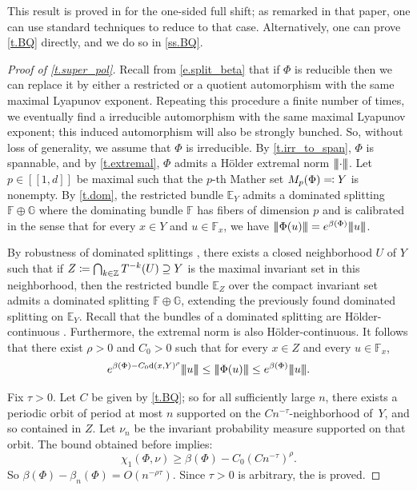 \documentclass[10pt]{amsart}
\newcommand{\ldbrack}{[\![}
\newcommand{\rdbrack}{]\!]}
\def\vcentcolon{\mathrel{\mathop\ordinarycolon}}
\providecommand\ordinarycolon{:}
\providecommand*\coloneqq{\vcentcolon\mathrel{\mkern-1.2mu}=}
\providecommand*\eqqcolon{=\mathrel{\mkern-1.2mu}\vcentcolon}
\let\eqcolon\eqqcolon
\theoremstyle{plain}
\theoremstyle{definition}
\newcommand{\tribar}[1]{\mathopen{| {\kern -1.5pt} | {\kern -1.5pt} |} {#1}
\mathclose{| {\kern -1.5pt} | {\kern -1.5pt} |}}
\newcommand{\ZZ}{\mathbb{Z}}
\newcommand{\EE}{\mathbb{E}}
\newcommand{\FF}{\mathbb{F}}
\newcommand{\GG}{\mathbb{G}}
\newcommand{\dd}{\mathrm{d}}
\begin{document}
This result is proved in \cite{BQuas} for the one-sided full shift; as remarked in that paper, one can use standard techniques to reduce to that case. Alternatively, one can prove \cref{t.BQ} directly, and we do so in \cref{ss.BQ}.

\begin{proof}[Proof of \cref{t.super_pol}]
Recall from \eqref{e.split_beta} that if $\Phi$ is reducible then we can replace it by either a restricted or a quotient automorphism with the same maximal Lyapunov exponent.
Repeating this procedure a finite number of times, we eventually find a irreducible automorphism with the same maximal Lyapunov exponent; this induced automorphism will also be strongly bunched.
So, without loss of generality, we assume that $\Phi$ is irreducible.
By \cref{t.irr_to_span}, $\Phi$ is spannable, and by \cref{t.extremal}, $\Phi$ admits a Hölder extremal norm $\tribar{\mathord{\cdot}}$.
Let $p \in \ldbrack 1, d \rdbrack$ be maximal such that the $p$-th Mather set $M_p(\Phi) \eqcolon Y$ is nonempty.
By \cref{t.dom}, the restricted bundle $\EE_Y$ admits a dominated splitting $\FF \oplus \GG$ where the dominating bundle $\FF$ has fibers of dimension $p$ and is calibrated in the sense that for every $x \in Y$ and $u \in \FF_x$, we have
$\tribar{\Phi(u)} = e^{\beta(\Phi)} \tribar{u}$.
	
By robustness of dominated splittings \cite[Cor.\,2.8]{CroPo}, there exists a closed neighborhood $U$ of $Y$ such that
if $Z \coloneqq \bigcap_{k \in \ZZ} T^{-k}(U) \supseteq Y$ is the maximal invariant set in this neighborhood,
then the restricted bundle $\EE_Z$ over the compact invariant set admits a dominated splitting $\FF \oplus \GG$, extending the previously found dominated splitting on $\EE_Y$.
Recall that the bundles of a dominated splitting are Hölder-continuous \cite[Th.\,4.11]{CroPo}.
Furthermore, the extremal norm is also Hölder-continuous.
It follows that there exist $\rho>0$ and $C_0>0$ such that for every $x \in Z$ and every $u \in \FF_x$,
\[
e^{\beta(\Phi) - C_0 \dd(x,Y)^\rho} \tribar{u} \le
\tribar{\Phi(u)} \le e^{\beta(\Phi)} \tribar{u}.
\]

Fix $\tau>0$.
Let $C$ be given by \cref{t.BQ}; so for all sufficiently large $n$, there exists a periodic orbit of period at most $n$ supported on the $C n^{-\tau}$-neighborhood of~$Y$, and so contained in $Z$.
Let $\nu_n$ be the invariant probability measure supported on that orbit.
The bound obtained before implies:
\[
\chi_1(\Phi,\nu) \ge \beta(\Phi) - C_0 (C n^{-\tau})^\rho.
\]
So $\beta(\Phi) - \beta_n(\Phi) = O(n^{-\rho \tau})$.
Since $\tau>0$ is arbitrary, the  is proved.
\end{proof}
\end{document}
